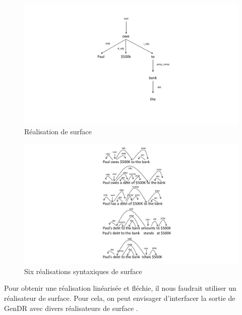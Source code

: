 \begin{figure}[htb]
	\centering
	\includegraphics[width=1\textwidth, trim = {0cm 3.5cm 3cm 2.2cm},clip]{ch3/figs/realsurfex.pdf}
	\caption{Réalisation de surface}
	\label{fig:realsurfex}
\end{figure} 

\begin{figure}[htb]
	\centering
	\includegraphics[width=1.1\textwidth, trim = {6cm 0.5cm 0cm 0cm},clip]{ch3/figs/6_real_surface.pdf}
	\caption{Six réalisations syntaxiques de surface \citep{lareau18}}
	\label{fig:6realsurf}
\end{figure}

Pour obtenir une réalisation linéarisée et fléchie, il nous faudrait utiliser un réalisateur de surface. Pour cela, on peut envisager d'interfacer la sortie de GenDR avec divers réalisateurs de surface \citep{DaoustJSREALTextRealizer2015, DBLP:conf/enlg/MolinsL15, GattSimpleNLGRealisationEngine2009, BelzFirstSurfaceRealisation2011}.


